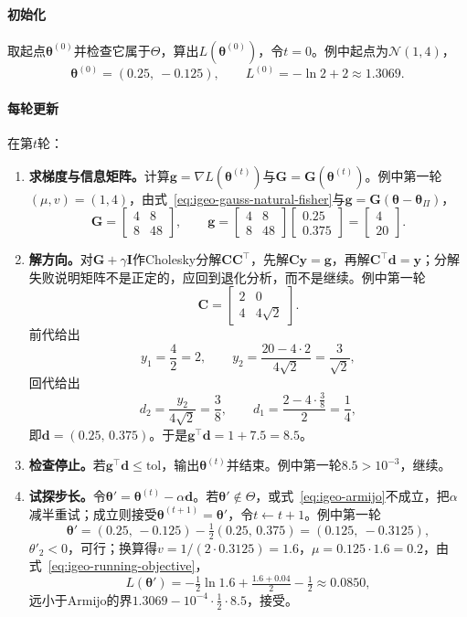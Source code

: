 \paragraph{初始化}
取起点$\bm{\theta}^{(0)}$并检查它属于$\Theta$，算出$L(\bm{\theta}^{(0)})$，令$t=0$。例中起点为$\mathcal{N}(1,4)$，
\[
  \bm{\theta}^{(0)}=(0.25,\ -0.125),\qquad L^{(0)}=-\ln2+2\approx1.3069 .
\]

\paragraph{每轮更新}
在第$t$轮：
\begin{enumerate}
  \item \textbf{求梯度与信息矩阵。}计算$\bm{g}=\nabla L(\bm{\theta}^{(t)})$与$\bm{G}=\bm{G}(\bm{\theta}^{(t)})$。例中第一轮$(\mu,v)=(1,4)$，由式~\eqref{eq:igeo-gauss-natural-fisher}与$\bm{g}=\bm{G}(\bm{\theta}-\bm{\theta}_{\Pi})$，
  \[
    \bm{G}=\begin{bmatrix}4&8\\8&48\end{bmatrix},\qquad\bm{g}=\begin{bmatrix}4&8\\8&48\end{bmatrix}\begin{bmatrix}0.25\\0.375\end{bmatrix}=\begin{bmatrix}4\\20\end{bmatrix}.
  \]

  \item \textbf{解方向。}对$\bm{G}+\gamma\bm{I}$作Cholesky分解$\bm{C}\bm{C}^{\top}$，先解$\bm{C}\bm{y}=\bm{g}$，再解$\bm{C}^{\top}\bm{d}=\bm{y}$；分解失败说明矩阵不是正定的，应回到退化分析，而不是继续。例中第一轮
  \[
    \bm{C}=\begin{bmatrix}2&0\\4&4\sqrt2\end{bmatrix}.
  \]
  前代给出
  \[
    y_1=\frac42=2,\qquad y_2=\frac{20-4\cdot2}{4\sqrt2}=\frac{3}{\sqrt2},
  \]
  回代给出
  \[
    d_2=\frac{y_2}{4\sqrt2}=\frac38,\qquad d_1=\frac{2-4\cdot\frac38}{2}=\frac14,
  \]
  即$\bm{d}=(0.25,\,0.375)$。于是$\bm{g}^{\top}\bm{d}=1+7.5=8.5$。

  \item \textbf{检查停止。}若$\bm{g}^{\top}\bm{d}\leq\mathrm{tol}$，输出$\bm{\theta}^{(t)}$并结束。例中第一轮$8.5>10^{-3}$，继续。

  \item \textbf{试探步长。}令$\bm{\theta}'=\bm{\theta}^{(t)}-\alpha\bm{d}$。若$\bm{\theta}'\notin\Theta$，或式~\eqref{eq:igeo-armijo}不成立，把$\alpha$减半重试；成立则接受$\bm{\theta}^{(t+1)}=\bm{\theta}'$，令$t\leftarrow t+1$。例中第一轮
  \[
    \bm{\theta}'=(0.25,\,-0.125)-\tfrac12(0.25,\,0.375)=(0.125,\ -0.3125),
  \]
  $\theta'_2<0$，可行；换算得$v=1/(2\cdot0.3125)=1.6$，$\mu=0.125\cdot1.6=0.2$，由式~\eqref{eq:igeo-running-objective}，
  \[
    L(\bm{\theta}')=-\tfrac12\ln1.6+\tfrac{1.6+0.04}{2}-\tfrac12\approx0.0850 ,
  \]
  远小于Armijo的界$1.3069-10^{-4}\cdot\frac12\cdot8.5$，接受。
\end{enumerate}

